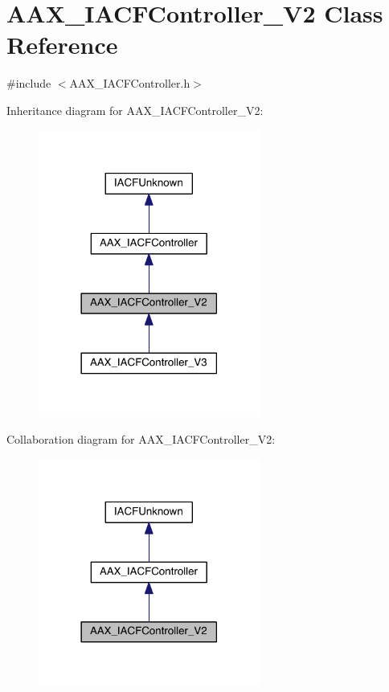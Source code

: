 \hypertarget{a00054}{}\section{A\+A\+X\+\_\+\+I\+A\+C\+F\+Controller\+\_\+\+V2 Class Reference}
\label{a00054}


{\ttfamily \#include $<$A\+A\+X\+\_\+\+I\+A\+C\+F\+Controller.\+h$>$}



Inheritance diagram for A\+A\+X\+\_\+\+I\+A\+C\+F\+Controller\+\_\+\+V2\+:
\nopagebreak
\begin{figure}[H]
\begin{center}
\leavevmode
\includegraphics[width=206pt]{a00505}
\end{center}
\end{figure}


Collaboration diagram for A\+A\+X\+\_\+\+I\+A\+C\+F\+Controller\+\_\+\+V2\+:
\nopagebreak
\begin{figure}[H]
\begin{center}
\leavevmode
\includegraphics[width=206pt]{a00506}
\end{center}
\end{figure}


